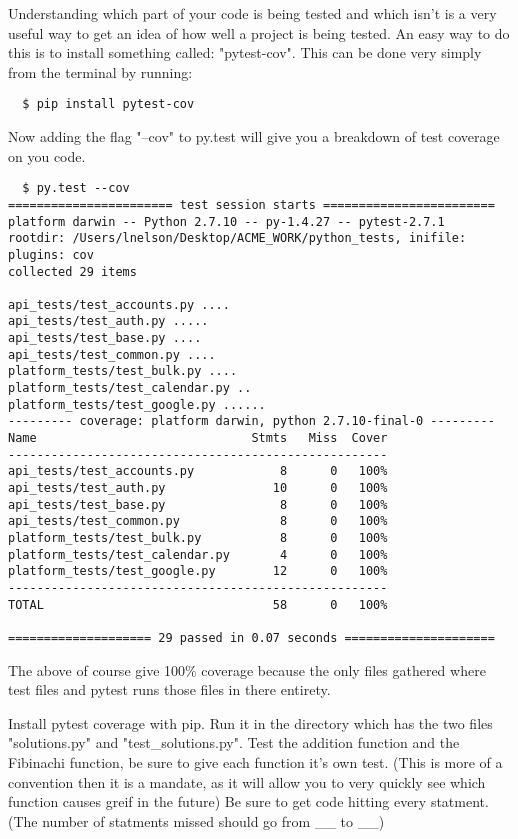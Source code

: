 Understanding which part of your code is being tested and which isn't is a very useful way to get an idea of how well a project is being tested.
An easy way to do this is to install something called: "pytest-cov". This can be done very simply from the terminal by running:
\begin{lstlisting}
  $ pip install pytest-cov
\end{lstlisting}
Now adding the flag "--cov" to py.test will give you a breakdown of test coverage on you code.
\begin{lstlisting}
  $ py.test --cov
======================= test session starts ========================
platform darwin -- Python 2.7.10 -- py-1.4.27 -- pytest-2.7.1
rootdir: /Users/lnelson/Desktop/ACME_WORK/python_tests, inifile:
plugins: cov
collected 29 items

api_tests/test_accounts.py ....
api_tests/test_auth.py .....
api_tests/test_base.py ....
api_tests/test_common.py ....
platform_tests/test_bulk.py ....
platform_tests/test_calendar.py ..
platform_tests/test_google.py ......
--------- coverage: platform darwin, python 2.7.10-final-0 ---------
Name                              Stmts   Miss  Cover
-----------------------------------------------------
api_tests/test_accounts.py            8      0   100%
api_tests/test_auth.py               10      0   100%
api_tests/test_base.py                8      0   100%
api_tests/test_common.py              8      0   100%
platform_tests/test_bulk.py           8      0   100%
platform_tests/test_calendar.py       4      0   100%
platform_tests/test_google.py        12      0   100%
-----------------------------------------------------
TOTAL                                58      0   100%

==================== 29 passed in 0.07 seconds =====================
\end{lstlisting}

The above of course give 100\% coverage because the only files gathered where test files and pytest runs those files in there entirety.

\begin{problem}
Install pytest coverage with pip.
Run it in the directory which has the two files "solutions.py" and "test\_solutions.py".
Test the addition function and the Fibinachi function, be sure to give each function it's own test. (This is more of a convention then it is a mandate,
as it will allow you to very quickly see which function causes greif in the future) Be sure to get code hitting every statment.
(The number of statments missed should go from \_\_ to \_\_)
\end{problem}

